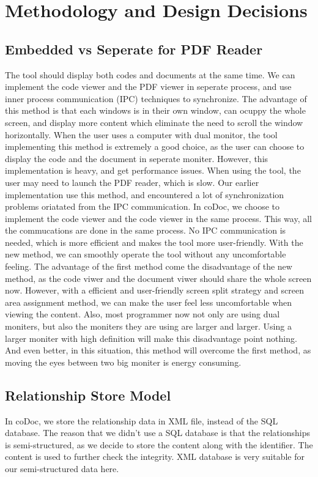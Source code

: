 \documentclass[11pt,letterpaper,oneside]{article}
\begin{document}
\section{Methodology and Design Decisions}
\label{sec:decision}
\subsection{Embedded vs Seperate for PDF Reader}
The tool should display both codes and documents at the same time.
We can implement the code viewer and the PDF viewer in seperate process,
and use inner process communication (IPC) techniques to synchronize.
The advantage of this method is that each windows is in their own window,
can ocuppy the whole screen,
and display more content which eliminate the need to scroll the window horizontally.
When the user uses a computer with dual monitor,
the tool implementing this method is extremely a good choice,
as the user can choose to display the code and the document in seperate moniter.
However, this implementation is heavy,
and get performance issues.
When using the tool, 
the user may need to launch the PDF reader,
which is slow.
Our earlier implementation use this method,
and encountered a lot of synchronization problems oriatated from the IPC communication.
In coDoc, we choose to implement the code viewer and the code viewer in the same process.
This way, all the commucations are done in the same process.
No IPC communication is needed,
which is more efficient and makes the tool more user-friendly.
With the new method, we can smoothly operate the tool without any uncomfortable feeling.
The advantage of the first method come the disadvantage of the new method,
as the code viwer and the document viwer should share the whole screen now.
However, with a efficient and user-friendly screen split strategy and screen area assignment method,
we can make the user feel less uncomfortable when viewing the content.
Also, most programmer now not only are using dual moniters, 
but also the moniters they are using are larger and larger.
Using a larger moniter with high definition will make this disadvantage point nothing.
And even better, in this situation, this method will overcome the first method,
as moving the eyes between two big moniter is energy consuming.

\subsection{Relationship Store Model}
In coDoc, we store the relationship data in XML file, 
instead of the SQL database.
The reason that we didn't use a SQL database is that the relationships is semi-structured,
as we decide to store the content along with the identifier.
The content is used to further check the integrity.
XML database is very suitable for our semi-structured data here.
\end{document}
